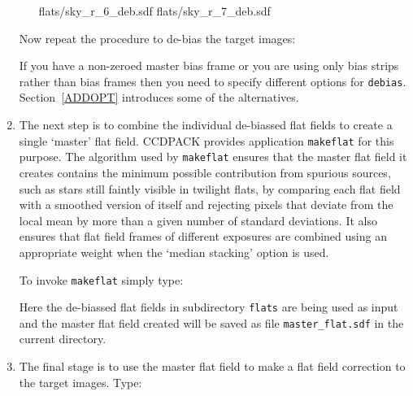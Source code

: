 \documentclass[twoside,11pt]{starlink}
\begin{document}
\begin{enumerate}
\begin{itemize}
\begin{terminalv}
flats/sky_r_6_deb.sdf
flats/sky_r_7_deb.sdf
\end{terminalv}

  \end{itemize}

   Now repeat the procedure to de-bias the target images:

\begin{terminalv}
\end{terminalv}

   If you have a non-zeroed master bias frame or you are using only bias
   strips rather than bias frames then you need to specify different
   options for \texttt{debias}.  Section~\ref{ADDOPT} introduces some of the
   alternatives.

  \item The next step is to combine the individual de-biassed flat fields
   to create a single `master' flat field.  CCDPACK provides application
   \texttt{makeflat} for this purpose.  The algorithm used by \texttt{makeflat}
   ensures that the master flat field it creates contains the minimum
   possible contribution from spurious sources, such as stars still faintly
   visible in twilight flats, by comparing each flat field with a smoothed
   version of itself and rejecting pixels that deviate from the local mean
   by more than a given number of standard deviations.  It also ensures
   that flat field frames of different exposures are combined using an
   appropriate weight when the `median stacking' option is used.

   To invoke \texttt{makeflat} simply type:

\begin{terminalv}
\end{terminalv}

   Here the de-biassed flat fields in subdirectory \texttt{flats} are being
   used as input and the master flat field created will be saved as
   file \texttt{master\_flat.sdf} in the current directory.

  \item The final stage is to use the master flat field to make a flat
   field correction to the target images.  Type:

\begin{terminalv}
\end{terminalv}


\end{enumerate}
\end{document}

